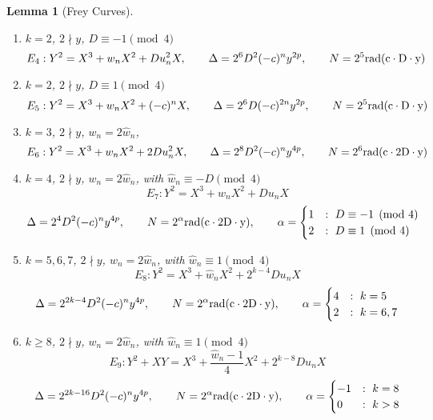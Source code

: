 \documentclass[12pt]{amsart}
\newtheorem{lem}[thm]{Lemma}
\theoremstyle{definition}
\newcommand{\rad}{\rm rad}
\newcommand{\notdiv}{\nmid}
\begin{document}
\begin{lem}[Frey Curves]
\begin{enumerate}[1.]
\item $k = 2$, $2 \notdiv y$, $D \equiv -1 \pmod{4}$
\[ E_{4} : Y^2 = X^3 + w_nX^2 +Du_n^2X, \qquad \Delta = 2^{6}D^2(-c)^ny^{2p}, \qquad N = 2^{5}\rad( c \cdot D \cdot y )  \]

\item $k = 2$, $2 \notdiv y$,  $D \equiv 1 \pmod{4}$
\[E_{5} : Y^2 = X^3 +w_nX^2 +(-c)^nX, \qquad \Delta = 2^{6}D(-c)^{2n}y^{2p}, \qquad N = 2^{5}\rad( c \cdot D \cdot y )  \]

\item $k = 3$, $2 \notdiv y$, $w_n = 2 \hat{w}_n$, 
\[ E_{6} : Y^2 = X^3 + w_nX^2 + 2Du_n^2X, \qquad  \Delta = 2^8D^2(-c)^ny^{4p} , \qquad N = 2^6 \rad( c \cdot 2D \cdot y)  \]

\item $k=4$, $2 \notdiv y$, $w_n = 2 \hat{w}_n$,  with $\hat{w}_n \equiv -D \pmod{4}$
\[ E_{7} : Y^2 = X^3 +\hat{w}_nX^2 + D u_n X\]
 \[ \Delta = 2^4D^2(-c)^ny^{4p}, \qquad N = 2^\alpha \rad( c \cdot 2D \cdot y) ,  \qquad \alpha =  \begin{cases} 1 & : \ D \equiv -1 \pmod{4}\\ 2 & : \ D \equiv 1 \pmod{4} \end{cases} \]


\item $k = 5,6,7$, $2 \notdiv y$, $w_n = 2 \hat{w}_n$, with $\hat{w}_n \equiv 1 \pmod{4}$
\[ E_{8} : Y^2 = X^3 + \hat{w}_nX^2 + 2^{k-4}D u_n X \]
\[ \Delta = 2^{2k-4}D^2(-c)^ny^{4p}, \qquad N = 2^\alpha \rad(c \cdot 2D \cdot y ) ,  \qquad \alpha =  \begin{cases} 4 &:  \ k = 5 \\ 2 &:  \ k = 6,7 \end{cases} \]


\item $k\geq 8$, $2 \notdiv y$, $w_n = 2 \hat{w}_n$, with $\hat{w}_n \equiv 1 \pmod{4}$
\[ E_{9} : Y^2 + XY = X^3 + \frac{\hat{w}_n-1}{4} X^2 + 2^{k-8}D u_n X \]
\[ \Delta = 2^{2k-16}D^2(-c)^ny^{4p}, \qquad N = 2^\alpha \rad(c \cdot 2D \cdot y) ,  \qquad \alpha =  \begin{cases} -1&: \ k = 8 \\ 0 &: \ k > 8 \end{cases} \]


\end{enumerate}
\end{lem}
\end{document}
